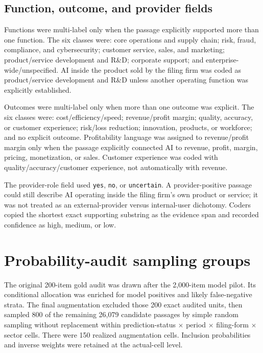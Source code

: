 \documentclass[11pt]{article}
\begin{document}
\subsection{Function, outcome, and provider fields}

Functions were multi-label only when the passage explicitly supported more
than one function. The six classes were: core operations and supply chain;
risk, fraud, compliance, and cybersecurity; customer service, sales, and
marketing; product/service development and R\&D; corporate support; and
enterprise-wide/unspecified. AI inside the product sold by the filing firm was
coded as product/service development and R\&D unless another operating
function was explicitly established.

Outcomes were multi-label only when more than one outcome was explicit. The
six classes were: cost/efficiency/speed; revenue/profit margin; quality,
accuracy, or customer experience; risk/loss reduction; innovation, products,
or workforce; and no explicit outcome. Profitability language was assigned
to revenue/profit margin only when the passage explicitly connected AI to
revenue, profit, margin, pricing, monetization, or sales. Customer experience
was coded with quality/accuracy/customer experience, not automatically with
revenue.

The provider-role field used \texttt{yes}, \texttt{no}, or
\texttt{uncertain}. A provider-positive passage could still describe AI
operating inside the filing firm's own product or service; it was not treated
as an external-provider versus internal-user dichotomy. Coders copied the
shortest exact supporting substring as the evidence span and recorded
confidence as high, medium, or low.

\section{Probability-audit sampling groups}

The original 200-item gold audit was drawn after the 2,000-item model pilot.
Its conditional allocation was enriched for model positives and likely
false-negative strata. The final augmentation excluded those 200 exact audited
units, then sampled 800 of the remaining 26,079 candidate passages by simple
random sampling without replacement within prediction-status $\times$ period
$\times$ filing-form $\times$ sector cells. There were 150 realized
augmentation cells. Inclusion probabilities and inverse weights were retained
at the actual-cell level.
\end{document}
